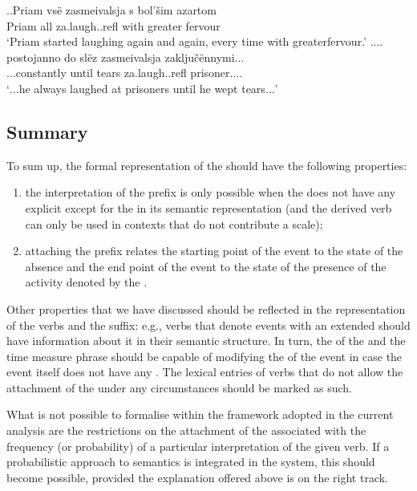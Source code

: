 \ex.\label{ex:za:laugh}\ag.\label{ex:za:laugh1}Priam vs\"{e} zasmeivalsja s bol'\v{s}im azartom\\
Priam all za.laugh..refl with greater fervour\\
\trans `Priam started laughing again and again, every time with greater\linebreak fervour.'
\bg.\label{ex:za:laugh2}$\ldots$postojanno do sl\"{e}z zasmeivalsja zaklju\v{c}\"{e}nnymi$\ldots$\\
$\ldots$constantly until tears za.laugh..refl prisoner.$\ldots$\\
\trans `$\ldots$he always laughed at prisoners until he wept tears$\ldots$'


\subsection{Summary}
To sum up, the formal representation of the   should have the following properties: 
\begin{enumerate}
\item the  interpretation of the prefix is only possible when the  does not have any explicit  except for the  in its semantic representation (and the derived verb can only be used in contexts that do not contribute a scale);
\item attaching the prefix  relates the starting point of the event to the state of the absence and the end point of the event to the state of the presence of the activity denoted by the .
\end{enumerate}

Other properties that we have discussed should be reflected in the representation of the verbs and the  suffix: e.g., verbs that denote events with an extended  should have information about it in their semantic structure. In turn, the  of the  and the time measure phrase should be capable of modifying the  of the event in case the event itself does not have any . The lexical entries of verbs that do not allow the attachment of the  under any circumstances should be marked as such.

What is not possible to formalise within the framework adopted in the current analysis are the restrictions on the attachment of the  associated with the frequency (or probability) of a particular interpretation of the given verb. If a probabilistic approach to semantics is integrated in the system, this should become possible, provided the explanation offered above is on the right track.


